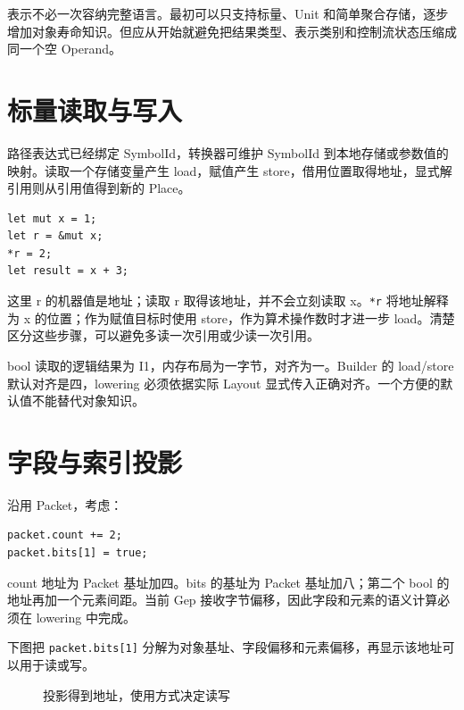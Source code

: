 表示不必一次容纳完整语言。最初可以只支持标量、Unit 和简单聚合存储，逐步增加对象寿命知识。但应从开始就避免把结果类型、表示类别和控制流状态压缩成同一个空 Operand。

\section{标量读取与写入}
路径表达式已经绑定 SymbolId，转换器可维护 SymbolId 到本地存储或参数值的映射。读取一个存储变量产生 load，赋值产生 store，借用位置取得地址，显式解引用则从引用值得到新的 Place。
\begin{lstlisting}[language=Rustless,caption={读取、借用、解引用与写入}]
let mut x = 1;
let r = &mut x;
*r = 2;
let result = x + 3;
\end{lstlisting}
这里 r 的机器值是地址；读取 r 取得该地址，并不会立刻读取 x。\texttt{*r} 将地址解释为 x 的位置；作为赋值目标时使用 store，作为算术操作数时才进一步 load。清楚区分这些步骤，可以避免多读一次引用或少读一次引用。

bool 读取的逻辑结果为 I1，内存布局为一字节，对齐为一。Builder 的 load/store 默认对齐是四，lowering 必须依据实际 Layout 显式传入正确对齐。一个方便的默认值不能替代对象知识。

\section{字段与索引投影}
沿用 Packet，考虑：
\begin{lstlisting}[language=Rustless,caption={由字段和索引组成的位置}]
packet.count += 2;
packet.bits[1] = true;
\end{lstlisting}
count 地址为 Packet 基址加四。bits 的基址为 Packet 基址加八；第二个 bool 的地址再加一个元素间距。当前 Gep 接收字节偏移，因此字段和元素的语义计算必须在 lowering 中完成。

下图把 \texttt{packet.bits[1]} 分解为对象基址、字段偏移和元素偏移，再显示该地址可以用于读或写。
\begin{figure}[htbp]\centering
{}
\caption{投影得到地址，使用方式决定读写}
\end{figure}

